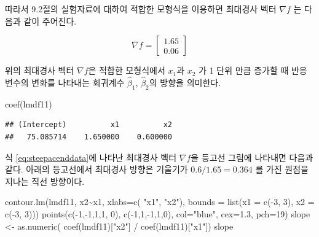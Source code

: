 \documentclass[
]{book}
\newenvironment{Shaded}{\begin{snugshade}}{\end{snugshade}}
\newcommand{\AttributeTok}[1]{\textcolor[rgb]{0.77,0.63,0.00}{#1}}
\newcommand{\DecValTok}[1]{\textcolor[rgb]{0.00,0.00,0.81}{#1}}
\newcommand{\FloatTok}[1]{\textcolor[rgb]{0.00,0.00,0.81}{#1}}
\newcommand{\FunctionTok}[1]{\textcolor[rgb]{0.00,0.00,0.00}{#1}}
\newcommand{\NormalTok}[1]{#1}
\newcommand{\OtherTok}[1]{\textcolor[rgb]{0.56,0.35,0.01}{#1}}
\newcommand{\SpecialCharTok}[1]{\textcolor[rgb]{0.00,0.00,0.00}{#1}}
\newcommand{\StringTok}[1]{\textcolor[rgb]{0.31,0.60,0.02}{#1}}
\theoremstyle{definition}
\theoremstyle{definition}
\theoremstyle{definition}
\theoremstyle{definition}
\theoremstyle{remark}
\begin{document}
따라서 9.2절의 실험자료에 대하여 적합한 모형식을 이용하면 최대경사 벡터 \(\nabla f\) 는 다음과 같이 주어진다.

\begin{equation}
\nabla f = 
\begin{bmatrix} 
1.65  \\
0.06 
\end{bmatrix}
\label{eq:steepacenddata}
\end{equation}

위의 최대경사 벡터 \(\nabla f\)은 적합한 모형식에서 \(x_1\)과 \(x_2\) 가 1 단위 만큼 증가할 때 반응변수의 변화를 나타내는 회귀계수 \(\hat \beta_1\), \(\hat \beta_2\)의 방향을 의미한다.

\begin{Shaded}
\begin{Highlighting}[]
\FunctionTok{coef}\NormalTok{(lmdf11)}
\end{Highlighting}
\end{Shaded}

\begin{verbatim}
## (Intercept)          x1          x2 
##   75.085714    1.650000    0.600000
\end{verbatim}

식 \eqref{eq:steepacenddata}에 나타난 최대경사 벡터 \(\nabla f\)을 등고선 그림에 나타내면 다음과 같다. 아래의 등고선에서
최대경사 방향은 기울기가 \(0.6/1.65=0.364\) 를 가진 원점을 지나는 직선 방향이다.

\begin{Shaded}
\begin{Highlighting}[]
\FunctionTok{contour.lm}\NormalTok{(lmdf11, x2}\SpecialCharTok{\textasciitilde{}}\NormalTok{x1, }\AttributeTok{xlabs=}\FunctionTok{c}\NormalTok{( }\StringTok{"x1"}\NormalTok{, }\StringTok{"x2"}\NormalTok{), }\AttributeTok{bounds =} \FunctionTok{list}\NormalTok{(}\AttributeTok{x1 =} \FunctionTok{c}\NormalTok{(}\SpecialCharTok{{-}}\DecValTok{3}\NormalTok{, }\DecValTok{3}\NormalTok{), }\AttributeTok{x2 =} \FunctionTok{c}\NormalTok{(}\SpecialCharTok{{-}}\DecValTok{3}\NormalTok{, }\DecValTok{3}\NormalTok{)))}
\FunctionTok{points}\NormalTok{(}\FunctionTok{c}\NormalTok{(}\SpecialCharTok{{-}}\DecValTok{1}\NormalTok{,}\SpecialCharTok{{-}}\DecValTok{1}\NormalTok{,}\DecValTok{1}\NormalTok{,}\DecValTok{1}\NormalTok{, }\DecValTok{0}\NormalTok{), }\FunctionTok{c}\NormalTok{(}\SpecialCharTok{{-}}\DecValTok{1}\NormalTok{,}\DecValTok{1}\NormalTok{,}\SpecialCharTok{{-}}\DecValTok{1}\NormalTok{,}\DecValTok{1}\NormalTok{,}\DecValTok{0}\NormalTok{), }\AttributeTok{col=}\StringTok{"blue"}\NormalTok{, }\AttributeTok{cex=}\FloatTok{1.3}\NormalTok{, }\AttributeTok{pch=}\DecValTok{19}\NormalTok{)}
\NormalTok{slope }\OtherTok{\textless{}{-}} \FunctionTok{as.numeric}\NormalTok{( }\FunctionTok{coef}\NormalTok{(lmdf11)[}\StringTok{"x2"}\NormalTok{] }\SpecialCharTok{/} \FunctionTok{coef}\NormalTok{(lmdf11)[}\StringTok{"x1"}\NormalTok{])}
\NormalTok{slope}
\end{Highlighting}
\end{Shaded}
\end{document}
